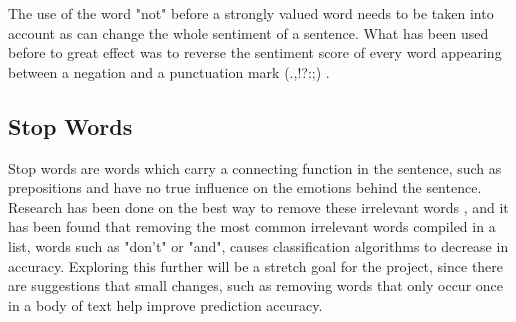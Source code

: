 The use of the word "not" before a strongly valued word needs to be taken into account as can change the whole sentiment of a sentence. 
What has been used before to great effect was to reverse the sentiment score of every word appearing between a negation and a punctuation mark (.,!?:;) \cite{kolchyna2015twitter}. 

\subsection{Stop Words}

Stop words are words which carry a connecting function in the sentence, such as prepositions and have no true influence on the emotions behind the sentence. Research has been done on the best way to remove these irrelevant words \cite{saif2014stopwords}, and it has been found that removing the most common irrelevant words compiled in a list, words such as "don't" or "and", causes classification algorithms to decrease in accuracy. Exploring this further will be a stretch goal for the project, since there are suggestions that small changes, such as removing words that only occur once in a body of text help improve prediction accuracy. 
